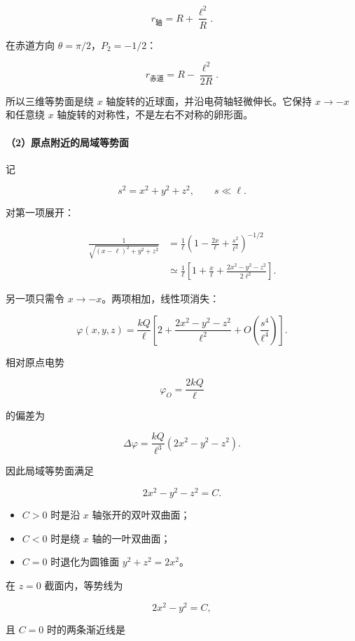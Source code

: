 \[
r_{\mathrm{\text{轴}}}
=R+\frac{\ell^2}{R}.
\]

在赤道方向 \(\theta=\pi/2\)，\(P_2=-1/2\)：

\[
r_{\mathrm{\text{赤道}}}
=R-\frac{\ell^2}{2R}.
\]

所以三维等势面是绕 \(x\) 轴旋转的近球面，并沿电荷轴轻微伸长。它保持
\(x\to-x\) 和任意绕 \(x\) 轴旋转的对称性，不是左右不对称的卵形面。

\paragraph{（2）原点附近的局域等势面}\label{m2:ux539fux70b9ux9644ux8fd1ux7684ux5c40ux57dfux7b49ux52bfux9762}

记

\[
s^2=x^2+y^2+z^2,
\qquad
s\ll\ell.
\]

对第一项展开：

\[
\begin{aligned}
\frac1{\sqrt{(x-\ell)^2+y^2+z^2}}
&=\frac1\ell
\left(
1-\frac{2x}{\ell}+\frac{s^2}{\ell^2}
\right)^{-1/2}\\
&\simeq\frac1\ell
\left[
1+\frac{x}{\ell}
+\frac{2x^2-y^2-z^2}{2\ell^2}
\right].
\end{aligned}
\]

另一项只需令 \(x\to-x\)。两项相加，线性项消失：

\[
\boxed{
\varphi(x,y,z)
=\frac{kQ}{\ell}
\left[
2+\frac{2x^2-y^2-z^2}{\ell^2}
+O\!\left(\frac{s^4}{\ell^4}\right)
\right]
}.
\]

相对原点电势

\[
\varphi_O=\frac{2kQ}{\ell}
\]

的偏差为

\[
\Delta\varphi
=\frac{kQ}{\ell^3}(2x^2-y^2-z^2).
\]

因此局域等势面满足

\[
\boxed{2x^2-y^2-z^2=C}.
\]

\begin{itemize}
\tightlist
\item
  \(C>0\) 时是沿 \(x\) 轴张开的双叶双曲面；
\item
  \(C<0\) 时是绕 \(x\) 轴的一叶双曲面；
\item
  \(C=0\) 时退化为圆锥面 \(y^2+z^2=2x^2\)。
\end{itemize}

在 \(z=0\) 截面内，等势线为

\[
\boxed{2x^2-y^2=C},
\]

且 \(C=0\) 时的两条渐近线是

